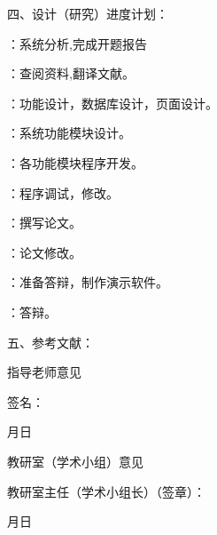 \documentclass{csustThesis}
\begin{document}
\begin{ubox}[breakable,]
\noindent 四、设计（研究）进度计划：

\settowidth{\maxwidth}{第 12-14 周}
：系统分析,完成开题报告

：查阅资料,翻译文献。

：功能设计，数据库设计，页面设计。

：系统功能模块设计。

：各功能模块程序开发。

：程序调试，修改。

：撰写论文。	

：论文修改。

：准备答辩，制作演示软件。

：答辩。

\end{ubox}

\vspace{-\baselineskip}

\begin{ubox}[breakable,]
\noindent 五、参考文献：

\printbibliography[segment=\therefsegment,heading=none]

\end{ubox}

\vspace{-\baselineskip}

\begin{ubox}
\begin{center}
	指导老师意见

	\vspace{6\baselineskip}  %

	\hspace{3cm}
	签名：\underline{\makebox[3cm][c]{}}
\end{center}

\begin{flushright}
	月\hspace{1cm}日\makebox[1.5cm]{}
\end{flushright}

\end{ubox}

\vspace{-\baselineskip}

\begin{ubox}
\begin{center}
	教研室（学术小组）意见

	\vspace{4.67\baselineskip}  %

\end{center}

\begin{flushleft}
	教研室主任（学术小组长）（签章）：
\end{flushleft}

\begin{flushright}
	月\hspace{1cm}日\makebox[1.5cm]{}
\end{flushright}

\end{ubox}
\end{document}
